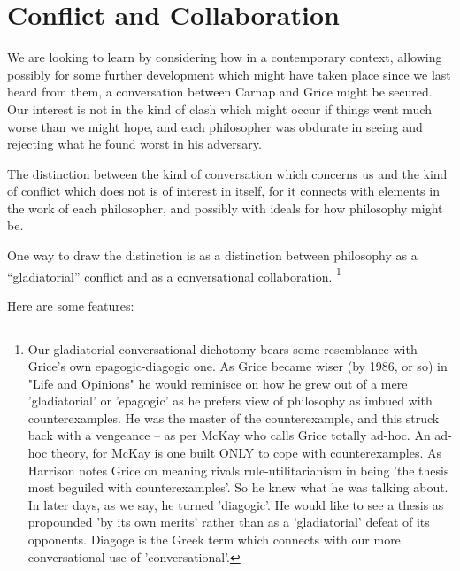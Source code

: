 \documentclass[10pt,titlepage]{book}
\begin{document}
\section{Conflict and Collaboration}

We are looking to learn by considering how in a contemporary context, allowing possibly for some further development which might have taken place since we last heard from them, a conversation between Carnap and Grice might be secured.
Our interest is not in the kind of clash which might occur if things went much worse than we might hope, and each philosopher was obdurate in seeing and rejecting what he found worst in his adversary.

The distinction between the kind of conversation which concerns us and the kind of conflict which does not is of interest in itself, for it connects with elements in the work of each philosopher, and possibly with ideals for how philosophy might be.

One way to draw the distinction is as a distinction between philosophy as a ``gladiatorial'' conflict and as a conversational collaboration.
\footnote{
Our gladiatorial-conversational dichotomy bears some resemblance with  
Grice's own epagogic-diagogic one. As Grice became wiser (by 1986, or so) in  
"Life and Opinions" he would reminisce on how he grew out of a mere  
'gladiatorial' or 'epagogic' as he prefers view of philosophy as imbued with  
counterexamples.
He was the master of the counterexample, and this struck back  
with a vengeance -- as per McKay\cite{mackay72} who calls Grice totally ad-hoc.
An ad-hoc theory, for McKay is one built ONLY to cope with counterexamples.
As Harrison notes \cite{harrison79} Grice on meaning rivals rule-utilitarianism in being 'the thesis most beguiled with 
counterexamples'.
So he knew what he was talking about.
In later days, as we say, he turned  'diagogic'.
He would like to see a thesis as propounded 'by its own merits' rather than as a 'gladiatorial' defeat of its opponents.
Diagoge is the Greek  term which connects with our more conversational use of 'conversational'.}

Here are some features:
\end{document}
